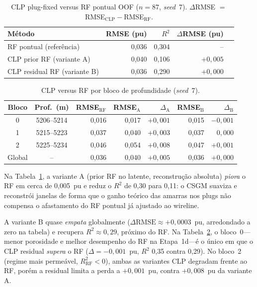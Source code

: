 \documentclass[11pt,a4paper]{article}
\begin{document}
\begin{table}[H]
  \centering
  \caption{CLP plug-fixed versus RF pontual OOF ($n=87$, \emph{seed}~7).
           $\Delta$RMSE $=$ RMSE$_{\mathrm{CLP}}-$RMSE$_{\mathrm{RF}}$.}
  \label{tab:clp_vs_rf_global}
  \begin{tabular}{lrrrr}
    \toprule
    Método & RMSE (pu) & $R^2$ & $\Delta$RMSE (pu) \\
    \midrule
    RF pontual (referência) & 0,036 & 0,304 & -- \\
    CLP prior RF (variante A) & 0,040 & 0,106 & $+0{,}005$ \\
    CLP residual RF (variante B) & 0,036 & 0,290 & $+0{,}000$ \\
    \bottomrule
  \end{tabular}
\end{table}

\begin{table}[H]
  \centering
  \caption{CLP versus RF por bloco de profundidade (\emph{seed}~7).}
  \label{tab:clp_vs_rf_blocks}
  \small
  \begin{tabular}{ccrrrrr}
    \toprule
    Bloco & Prof.\ (m) & RMSE$_{\mathrm{RF}}$ & RMSE$_{\mathrm{A}}$ &
    $\Delta_{\mathrm{A}}$ & RMSE$_{\mathrm{B}}$ & $\Delta_{\mathrm{B}}$ \\
    \midrule
    0 & 5206--5214 & 0,016 & 0,017 & $+0{,}001$ & 0,015 & $-0{,}001$ \\
    1 & 5215--5223 & 0,037 & 0,040 & $+0{,}003$ & 0,037 & $0{,}000$ \\
    2 & 5225--5234 & 0,046 & 0,054 & $+0{,}008$ & 0,047 & $+0{,}001$ \\
    \midrule
    Global & -- & 0,036 & 0,040 & $+0{,}005$ & 0,036 & $+0{,}000$ \\
    \bottomrule
  \end{tabular}
\end{table}

Na Tabela~\ref{tab:clp_vs_rf_global}, a variante A (prior RF no latente,
reconstrução absoluta) \emph{piora} o RF em cerca de 0,005~pu e reduz
o $R^2$ de 0,30 para 0,11: o CSGM suaviza e reconstrói janelas de forma
que o ganho teórico das amarras nos plugs não compensa o afastamento do
RF pontual já ajustado ao wireline.

A variante B quase \emph{empata} globalmente ($\Delta\mathrm{RMSE}
\approx +0{,}0003$~pu, arredondado a zero na tabela) e recupera
$R^2\approx 0{,}29$, próximo do RF.
Na Tabela~\ref{tab:clp_vs_rf_blocks}, o bloco~0---menor porosidade e
melhor desempenho do RF na Etapa~1d---é o único em que o CLP residual
\emph{supera} o RF ($\Delta=-0{,}001$~pu, $R^2$ 0,35 contra 0,29).
No bloco~2 (regime mais permeável, $R^2_{\mathrm{RF}}<0$), ambas as
variantes CLP degradam frente ao RF, porém a residual limita a perda a
$+0{,}001$~pu, contra $+0{,}008$~pu da variante A.
\end{document}
